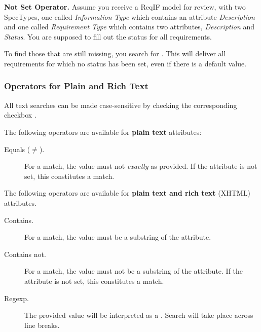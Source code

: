 {{{\begin{example}
\textbf{Not Set Operator.}
Assume you receive a ReqIF model for review, with two SpecTypes, one called \textit{Information Type} which contains an attribute \textit{Description} and one called \textit{Requirement Type} which contains two attributes, \textit{Description} and \textit{Status}.  You are supposed to fill out the status for all requirements.

To find those that are still missing, you search for  .  This will deliver all requirements for which no status has been set, even if there is a default value.
\end{example}

\subsubsection{Operators for Plain and Rich Text}

All text searches can be made case-sensitive by checking the corresponding checkbox .

The following operators are available for \textbf{plain text} attributes:

\begin{description}
\item[Equals ($\neq$).] For a match, the value must not \textit{exactly} as provided.  If the attribute is not set, this constitutes a match.
\end{description}

The following operators are available for \textbf{plain text and rich text} (XHTML) attributes.

\begin{description}
\item[Contains.] For a match, the value must be a substring of the attribute.
\item[Contains not.] For a match, the value must not be a substring of the attribute. If the attribute is not set, this constitutes a match.
\item[Regexp.] The provided value will be interpreted as a .  Search will take place across line breaks.
\end{description}

}}}
